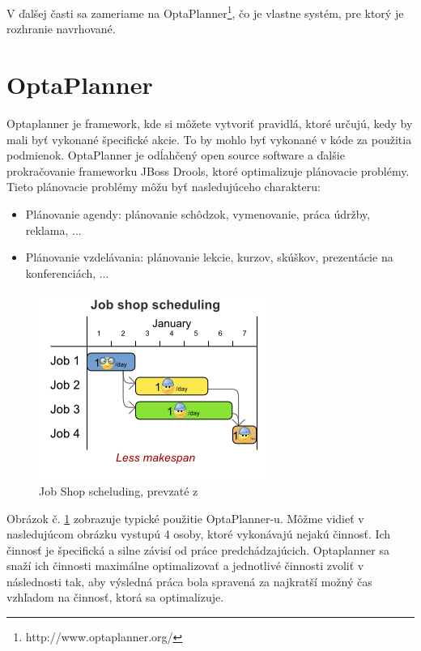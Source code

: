 V ďalšej časti sa zameriame na OptaPlanner\footnote{http://www.optaplanner.org/}, čo je vlastne systém, pre ktorý je rozhranie navrhované.




\section{OptaPlanner}
 Optaplanner je framework, kde si môžete vytvoriť pravidlá, ktoré určujú, kedy by mali byť vykonané špecifické akcie. To by mohlo byť vykonané v kóde za použitia podmienok.
OptaPlanner je odĺahčený open source software a ďalšie prokračovanie frameworku JBoss Drools, ktoré optimalizuje plánovacie problémy.\cite{optaweb} Tieto plánovacie problémy môžu byť nasledujúceho charakteru: 
\begin{itemize}
\item Plánovanie agendy: plánovanie schôdzok, vymenovanie, práca údržby, reklama, ...
\item Plánovanie vzdelávania: plánovanie lekcie, kurzov, skúškov, prezentácie na konferenciách, ...
\end{itemize}
\begin{figure}[htb]

\begin{center}

\includegraphics[scale=0.5]{fig/useCaseOverview.jpg} 
\caption{Job  Shop scheluding, prevzaté z  }
\label{obrazokUseCase}

\end{center}

\end{figure}
Obrázok č. \ref{obrazokUseCase} zobrazuje typické použitie OptaPlanner-u. Môžme vidieť v nasledujúcom obrázku vystupú 4 osoby, ktoré vykonávajú nejakú činnosť. Ich činnosť je špecifická a silne závisí od práce predchádzajúcich. Optaplanner sa snaží ich činnosti maximálne optimalizovať a jednotlivé činnosti zvoliť v následnosti tak, aby výsledná práca bola spravená za najkratší možný čas vzhľadom na činnosť, ktorá sa optimalizuje.


